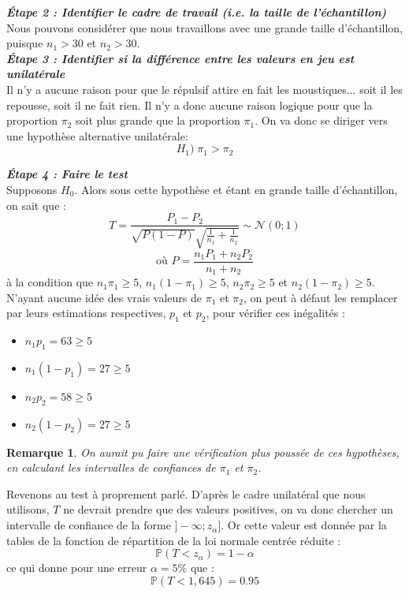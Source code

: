 \documentclass[a4paper,oneside,12pt]{article}
\theoremstyle{plain}
\newtheorem*{remark}{Remarque}
\def\P{{\mathbb P}}
\begin{document}
\textit{\textbf{Étape 2 : Identifier le cadre de travail (i.e. la taille de l'échantillon)}}\\
Nous pouvons considérer que nous travaillons avec une grande taille d'échantillon, puisque $n_1>30$ et $n_2>30$.\\

\textit{\textbf{Étape 3 : Identifier si la différence entre les valeurs en jeu est unilatérale}}\\
Il n'y a aucune raison pour que le répulsif attire en fait les moustiques... soit il les repousse, soit il ne fait rien. Il n'y a donc aucune raison logique pour que la proportion $\pi_2$ soit plus grande que la proportion $\pi_1$. On va donc se diriger vers une hypothèse alternative unilatérale:
$$H_1) \;\pi_1>\pi_2$$ 
    
\textit{\textbf{Étape 4 : Faire le test}}\\
Supposons $H_0$. Alors sous cette hypothèse et étant en grande taille d'échantillon, on sait que :
$$ T = \frac{P_1 -P_2}{\sqrt{P(1-P)}\sqrt{\frac{1}{n_1}+\frac{1}{n_2}}} \sim \mathcal{N}(0;1)$$
$$\mbox{où } P = \frac{n_1P_1 + n_2P_2}{n_1+n_2}$$ 
à la condition que $n_1\pi_1 \ge 5$,  $n_1(1-\pi_1) \ge 5$,  $n_2\pi_2 \ge 5$ et $n_2(1-\pi_2) \ge 5$. N'ayant aucune idée des vrais valeurs de $\pi_1$ et $\pi_2$, on peut à défaut les remplacer par leurs estimations respectives, $p_1$ et $p_2$, pour vérifier ces inégalités :
\begin{itemize}
    \item $n_1p_1 = 63 \ge 5$
    \item $n_1(1-p_1) = 27 \ge 5$
    \item $n_2p_2 = 58 \ge 5$
    \item $n_2(1-p_2) = 27 \ge 5$
\end{itemize}


\begin{remark}
On aurait pu faire une vérification plus poussée de ces hypothèses, en calculant les intervalles de confiances de $\pi_1$ et $\pi_2$.
\end{remark}

Revenons au test à proprement parlé.
D'après le cadre unilatéral que nous utilisons, $T$ ne devrait prendre que des valeurs positives, on va donc chercher un intervalle de confiance de la forme $]-\infty;z_\alpha]$. Or cette valeur est donnée par la tables de la fonction de répartition de la loi normale centrée réduite : 
$$\P(T<z_\alpha) = 1-\alpha$$
ce qui donne pour une erreur $\alpha = 5\%$ que :
$$\P(T < 1,645) = 0.95$$
    
\end{document}
